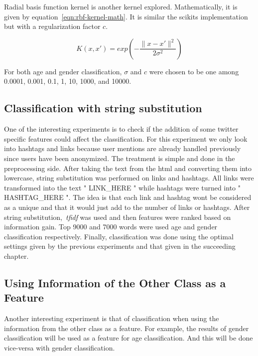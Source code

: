 \documentclass[a4paper]{llncs}
\begin{document}
Radial basis function kernel is another kernel explored. Mathematically, it is given by equation~\ref{eqn:rbf-kernel-math}. It is similar the scikits implementation but with a regularization factor $c$. 

\begin{equation}
K(x,x')= exp\left( -\frac{\parallel x-x'\parallel^2}{2\sigma^2} \right)
\label{eqn:rbf-kernel-math}
\end{equation} 

For both age and gender classification, $\sigma$ and $c$ were chosen to be one among 0.0001, 0.001, 0.1, 1, 10, 1000, and 10000.

\subsection{Classification with string substitution}
One of the interesting experiments is to check if the addition of some twitter specific features could affect the classification. For this experiment we only look into hashtags and links because user mentions are already handled previously since users have been anonymized. The treatment is simple and done in the preprocessing side. After taking the text from the html and converting them into lowercase, string substitution was performed on links and hashtags. All links were transformed into the text " LINK\_HERE " while hashtags were turned into " HASHTAG\_HERE ". The idea is that each link and hashtag wont be considered as a unique and that it would just add to the number of links or hashtags. After string substitution,~\textit{tfidf} was used and then features were ranked based on information gain. Top 9000 and 7000 words were used age and gender classification respectively. Finally, classification was done using the optimal settings given by the previous experiments and that given in the succeeding chapter. 


\subsection{Using Information of the Other Class as a Feature}
Another interesting experiment is that of classification when using the information from the other class as a feature. For example, the results of gender classification will be used as a feature for age classification. And this will be done vice-versa with gender classification.  
\end{document}
